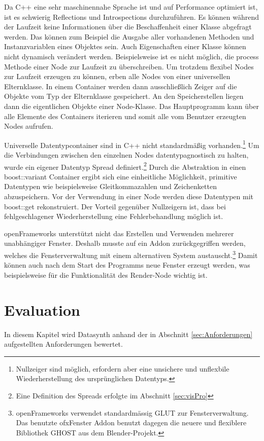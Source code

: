 \documentclass[a4paper, 
               12pt,
               DIV=calc,
               version=first,
               pdftex,
               headsepline,
               footsepline,
               bibtotocnumbered,
               liststotocnumbered]{scrreprt}
\begin{document}
Da C++ eine sehr maschinennahe Sprache ist und auf Performance optimiert ist,
ist es schwierig Reflections und Introspections durchzuführen.
Es können während der Laufzeit keine Informationen
über die Beschaffenheit einer Klasse abgefragt werden.
Das können zum Beispiel die Ausgabe aller vorhandenen Methoden und Instanzvariablen eines Objektes sein.
Auch Eigenschaften einer Klasse können nicht dynamisch verändert werden. Beispielsweise
ist es nicht möglich, die process Methode einer Node zur Laufzeit zu überschreiben.
Um trotzdem flexibel Nodes zur Laufzeit erzeugen zu können, erben alle Nodes
von einer universellen Elternklasse. In einem Container werden dann ausschließlich Zeiger
auf die Objekte vom Typ der Elternklasse gespeichert. An den Speicherstellen
liegen dann die eigentlichen Objekte einer Node-Klasse. Das Hauptprogramm kann
über alle Elemente des Containers iterieren und somit alle vom Benutzer erzeugten
Nodes aufrufen.

Universelle Datentypcontainer sind in C++ nicht standardmäßig vorhanden.\footnote{Nullzeiger sind
möglich, erfordern aber eine unsichere und unflexbile Wiederherstellung des ursprünglichen Datentyps.} Um die Verbindungen
zwischen den einzelnen Nodes datentypagnostisch zu halten, wurde ein
eigener Datentyp Spread definiert.\footnote{Eine Definition des Spreads erfolgte im Abschnitt \ref{sec:visPro}}
Durch die Abstraktion in einen boost::variant Container ergibt sich eine einheitliche Möglichkeit, primitive Datentypen
wie beispielsweise Gleitkommazahlen und Zeichenketten abzuspeichern. Vor der Verwendung in einer Node werden diese
Datentypen mit boost::get rekonstruiert. Der Vorteil gegenüber Nullzeigern ist, dass bei fehlgeschlagener
Wiederherstellung eine Fehlerbehandlung möglich ist.

openFrameworks unterstützt nicht das Erstellen und Verwenden mehrerer
unabhängiger Fenster. Deshalb musste
auf ein Addon zurückgegriffen werden, welches die Fensterverwaltung
mit einem alternativen System austauscht.\footnote{openFrameworks verwendet standardmässig GLUT
zur Fensterverwaltung. Das benutzte ofxFenster Addon benutzt dagegen die neuere und
flexiblere Bibliothek GHOST aus dem Blender-Projekt.} Damit können auch nach dem Start des Programms
neue Fenster erzeugt werden, was beispielsweise für die Funktionalität des Render-Node wichtig ist.

\chapter{Evaluation}
\label{cha:Auswertung}
In diesem Kapitel wird Datasynth anhand der in Abschnitt \ref{sec:Anforderungen}
aufgestellten Anforderungen bewertet.
\end{document}
